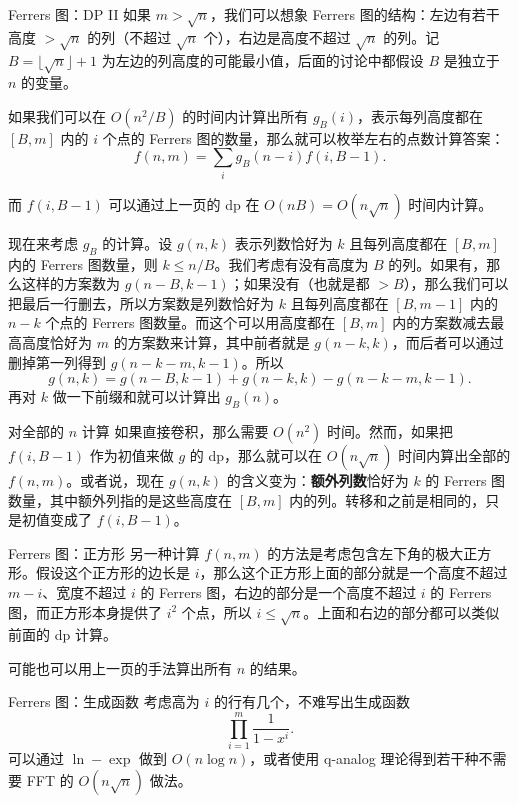 \begin{frame}{Ferrers 图：DP II}
            如果 $m>\sqrt{n}$，我们可以想象 Ferrers 图的结构：左边有若干高度 $>\sqrt{n}$ 的列（不超过 $\sqrt{n}$ 个），右边是高度不超过 $\sqrt{n}$ 的列。记 $B=\lfloor \sqrt{n}\rfloor+1$ 为左边的列高度的可能最小值，后面的讨论中都假设 $B$ 是独立于 $n$ 的变量。
            
            如果我们可以在 $O(n^2/B)$ 的时间内计算出所有 $g_B(i)$，表示每列高度都在 $[B,m]$ 内的 $i$ 个点的 Ferrers 图的数量，那么就可以枚举左右的点数计算答案：
            $$
            f(n,m)=\sum_{i}g_B(n-i)f(i,B-1).
            $$      

            而 $f(i,B-1)$ 可以通过上一页的 dp 在 $O(nB)=O(n\sqrt{n})$ 时间内计算。
\end{frame}            
\begin{frame}
            现在来考虑 $g_B$ 的计算。设 $g(n,k)$ 表示列数恰好为 $k$ 且每列高度都在 $[B,m]$ 内的 Ferrers 图数量，则 $k\le n/B$。我们考虑有没有高度为 $B$ 的列。如果有，那么这样的方案数为 $g(n-B,k-1)$；如果没有（也就是都 $>B$），那么我们可以把最后一行删去，所以方案数是列数恰好为 $k$ 且每列高度都在 $[B,m-1]$ 内的 $n-k$ 个点的 Ferrers 图数量。而这个可以用高度都在 $[B,m]$ 内的方案数减去最高高度恰好为 $m$ 的方案数来计算，其中前者就是 $g(n-k,k)$，而后者可以通过删掉第一列得到 $g(n-k-m,k-1)$。所以
            $$
            g(n,k)=g(n-B,k-1)+g(n-k,k)-g(n-k-m,k-1).
            $$ 
            再对 $k$ 做一下前缀和就可以计算出 $g_B(n)$。
\end{frame}
\begin{frame}{对全部的 $n$ 计算}
    如果直接卷积，那么需要 $O(n^2)$ 时间。然而，如果把 $f(i,B-1)$ 作为初值来做 $g$ 的 dp，那么就可以在 $O(n\sqrt{n})$ 时间内算出全部的 $f(n,m)$。或者说，现在 $g(n,k)$ 的含义变为：\textbf{额外列数}恰好为 $k$ 的 Ferrers 图数量，其中额外列指的是这些高度在 $[B,m]$ 内的列。转移和之前是相同的，只是初值变成了 $f(i,B-1)$。
\end{frame}
\begin{frame}{Ferrers 图：正方形}
    另一种计算 $f(n,m)$ 的方法是考虑包含左下角的极大正方形。假设这个正方形的边长是 $i$，那么这个正方形上面的部分就是一个高度不超过 $m-i$、宽度不超过 $i$ 的 Ferrers 图，右边的部分是一个高度不超过 $i$ 的 Ferrers 图，而正方形本身提供了 $i^2$ 个点，所以 $i\le \sqrt{n}$。上面和右边的部分都可以类似前面的 dp 计算。

    可能也可以用上一页的手法算出所有 $n$ 的结果。
\end{frame}
\begin{frame}{Ferrers 图：生成函数}
    考虑高为 $i$ 的行有几个，不难写出生成函数
    $$
    \prod_{i=1}^m\frac{1}{1-x^i}.
    $$
    可以通过 $\ln-\exp$ 做到 $O(n\log n)$，或者使用 q-analog 理论得到若干种不需要 FFT 的 $O(n\sqrt{n})$ 做法。
\end{frame}
